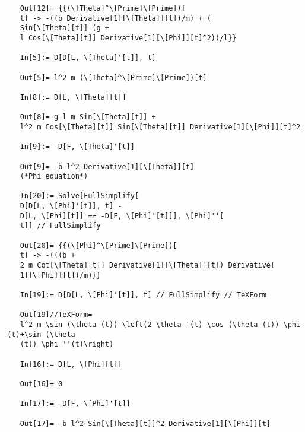 \documentclass{article}
\theoremstyle{definition}
\begin{document}
\begin{enumerate}[label = (\alph*)]
\begin{lstlisting}
	Out[12]= {{(\[Theta]^\[Prime]\[Prime])[
	t] -> -((b Derivative[1][\[Theta]][t])/m) + (
	Sin[\[Theta][t]] (g + 
	l Cos[\[Theta][t]] Derivative[1][\[Phi]][t]^2))/l}}
	
	In[5]:= D[D[L, \[Theta]'[t]], t]
	
	Out[5]= l^2 m (\[Theta]^\[Prime]\[Prime])[t]
	
	In[8]:= D[L, \[Theta][t]]
	
	Out[8]= g l m Sin[\[Theta][t]] + 
	l^2 m Cos[\[Theta][t]] Sin[\[Theta][t]] Derivative[1][\[Phi]][t]^2
	
	In[9]:= -D[F, \[Theta]'[t]]
	
	Out[9]= -b l^2 Derivative[1][\[Theta]][t]
	(*Phi equation*)
	
	In[20]:= Solve[FullSimplify[
	D[D[L, \[Phi]'[t]], t] - 
	D[L, \[Phi][t]] == -D[F, \[Phi]'[t]]], \[Phi]''[
	t]] // FullSimplify
	
	Out[20]= {{(\[Phi]^\[Prime]\[Prime])[
	t] -> -(((b + 
	2 m Cot[\[Theta][t]] Derivative[1][\[Theta]][t]) Derivative[
	1][\[Phi]][t])/m)}}
	
	In[19]:= D[D[L, \[Phi]'[t]], t] // FullSimplify // TeXForm
	
	Out[19]//TeXForm=
	l^2 m \sin (\theta (t)) \left(2 \theta '(t) \cos (\theta (t)) \phi '(t)+\sin (\theta
	(t)) \phi ''(t)\right)
	
	In[16]:= D[L, \[Phi][t]]
	
	Out[16]= 0
	
	In[17]:= -D[F, \[Phi]'[t]]
	
	Out[17]= -b l^2 Sin[\[Theta][t]]^2 Derivative[1][\[Phi]][t]
	\end{lstlisting}
\end{enumerate} 
\end{document}

